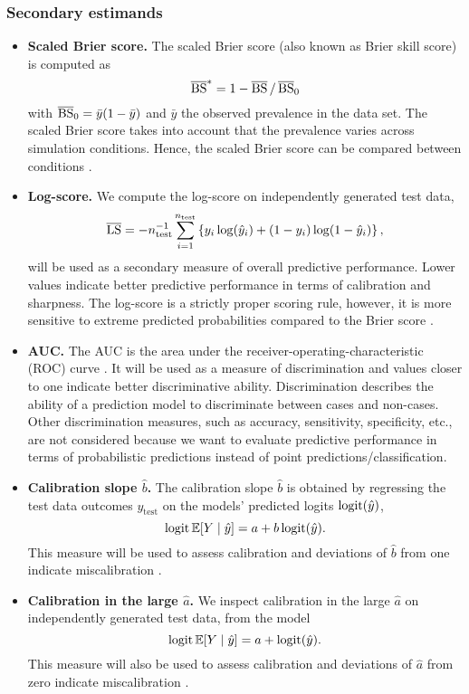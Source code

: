 \subsubsection{Secondary estimands}
\begin{itemize}
  \item \textbf{Scaled Brier score.} The scaled Brier score (also known as Brier skill score) is computed as
  $$\operatorname{\overline{BS}}^{*} = 1 - \operatorname{\overline{BS}}/\operatorname{\overline{BS}}_{0}$$
  with $\operatorname{\overline{BS}}_{0} = \bar{y}(1 - \bar{y})$ and $\bar{y}$ the observed prevalence in
  the data set. The scaled Brier score takes into account that the
  prevalence varies across simulation conditions. Hence, the scaled Brier score
  can be compared between conditions \citep{Schmid2005, steyerberg2019clinical}.

  \item \textbf{Log-score.} We compute the log-score on independently generated test data,
  $$\operatorname{\overline{LS}} = - n_{\text{test}}^{-1} \sum_{i=1}^{n_{\text{test}}} \left\{ y_{i} \log(\hat{y}_{i})
  + (1 - y_{i}) \log (1 - \hat{y}_{i})\right\},$$
  will be used as a secondary measure of overall predictive performance. Lower
  values indicate better predictive performance in terms of calibration and
  sharpness. The log-score is a strictly proper scoring rule, however, it is more
  sensitive to extreme predicted probabilities compared to the Brier score \citep{Gneiting2007}.
  
  \item \textbf{AUC.} The AUC is the area under the
        receiver-operating-characteristic (ROC) curve
        \citep{steyerberg2019clinical}. It will be used as a measure of
        discrimination and values closer to one indicate better discriminative
        ability. Discrimination describes the ability of a prediction model to
        discriminate between cases and non-cases. Other discrimination measures,
        such as accuracy, sensitivity, specificity, etc., are not considered
        because we want to evaluate predictive performance in terms of
        probabilistic predictions instead of point predictions/classification.

  \item \textbf{Calibration slope $\hat b$.}  
  The calibration slope $\hat b$ is obtained by regressing
  the test data outcomes $y_{\text{test}}$ on the models' predicted logits $\operatorname{logit}({\hat{y}})$,
  \ie
  $$\operatorname{logit}\mathbb{E}[Y \mid \hat{y}] = a + b\operatorname{logit}(\hat{y}).$$
  This measure will be used to assess calibration and deviations of $\hat b$ from
  one indicate miscalibration \citep{steyerberg2019clinical}.

  \item \textbf{Calibration in the large $\hat a$.} We inspect calibration in the
  large $\hat a$ on independently generated test data, from the model
  $$\operatorname{logit}\mathbb{E}[Y \mid \hat{y}] = a + \operatorname{logit}(\hat{y}).$$
  This measure will also be used to assess calibration and deviations of $\hat a$ from
  zero indicate miscalibration \citep{steyerberg2019clinical}.
\end{itemize}

